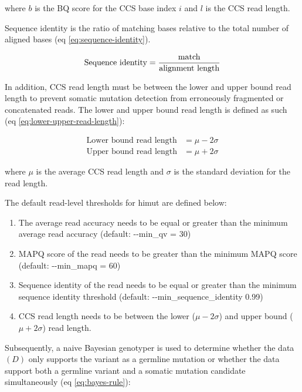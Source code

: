 where $b$ is the BQ score for the CCS base index $i$ and $l$ is the CCS read length.

Sequence identity is the ratio of matching bases relative to the total number of aligned bases (eq \ref{eq:sequence-identity}).  

\begin{equation} \label{eq:sequence-identity}
\text{Sequence identity} = \frac{\text{match}}{\text{alignment length}} \smallskip
\end{equation}

In addition, CCS read length must be between the lower and upper bound read length to prevent somatic mutation detection from erroneously fragmented or concatenated reads. The lower and upper bound read length is defined as such (eq \ref{eq:lower-upper-read-length}): 


\begin{equation}
\begin{aligned} 
\text{Lower bound read length} &= \mu - 2\sigma \\
\text{Upper bound read length} &= \mu + 2\sigma 
\end{aligned}
\label{eq:lower-upper-read-length}
\end{equation}

where $\mu$ is the average CCS read length and $\sigma$ is the standard deviation for the read length. 

The default read-level thresholds for himut are defined below:

\begin{enumerate}
\item The average read accuracy needs to be equal or greater than the minimum average read accuracy (default: -{}-min\_qv = 30)
\item MAPQ score of the read needs to be greater than the minimum MAPQ score (default: -{}-min\_mapq = 60)
\item Sequence identity of the read needs to be equal or greater than the minimum sequence identity threshold (default: -{}-min\_sequence\_identity 0.99)
\item CCS read length needs to be between the lower ($\mu - 2\sigma$) and upper bound ($\mu + 2\sigma$) read length.
\end{enumerate}

Subsequently, a naive Bayesian genotyper is used to determine whether the data $(D)$ only supports the variant as a germline mutation or whether the data support both a germline variant and a somatic mutation candidate simultaneously (eq \ref{eq:bayes-rule}):

